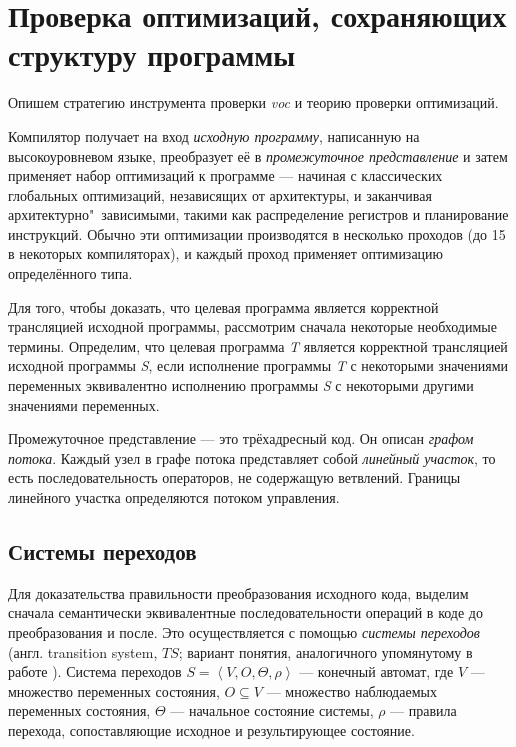 \section{Проверка оптимизаций, сохраняющих структуру программы}

Опишем стратегию инструмента проверки \emph{voc} \cite{ZPFG02} и теорию проверки оптимизаций.

Компилятор получает на вход \emph{исходную программу}, написанную на высокоуровневом языке, преобразует её в \emph{промежуточное представление} и затем применяет набор оптимизаций к программе --- начиная с классических глобальных оптимизаций, независящих от архитектуры, и заканчивая архитектурно"~зависимыми, такими как распределение регистров и планирование инструкций. Обычно эти оптимизации производятся в несколько проходов (до 15 в некоторых компиляторах), и каждый проход применяет оптимизацию определённого типа.

Для того, чтобы доказать, что целевая программа является корректной трансляцией исходной программы, рассмотрим сначала некоторые необходимые термины. Определим, что целевая программа \emph{T} является корректной трансляцией исходной программы \emph{S}, если исполнение программы \emph{T} с некоторыми значениями переменных эквивалентно исполнению программы \emph{S} с некоторыми другими значениями переменных.

Промежуточное представление --- это трёхадресный код. Он описан \emph{графом потока}. Каждый узел в графе потока представляет собой \emph{линейный участок}, то есть последовательность операторов, не содержащую ветвлений. Границы линейного участка определяются потоком управления.

\subsection{Системы переходов}

Для доказательства правильности преобразования исходного кода, выделим сначала семантически эквивалентные последовательности операций в коде до преобразования и после. Это осуществляется с помощью \emph{системы переходов} (англ. transition system, $TS$; вариант понятия, аналогичного упомянутому в работе \cite{PSS98b}). Система переходов $S = \left\langle  V, O, \Theta, \rho \right\rangle $ --- конечный автомат, где $V$ --- множество переменных состояния, $O \subseteq V$ --- множество наблюдаемых переменных состояния, $\Theta$ --- начальное состояние системы, $\rho$ --- правила перехода, сопоставляющие исходное и результирующее состояние.

